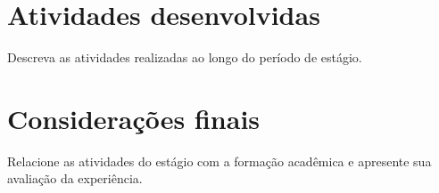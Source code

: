 \documentclass[12pt,a4paper,oneside]{book}
\begin{document}
\chapter{Atividades desenvolvidas}\label{cap:atividades}

Descreva as atividades realizadas ao longo do período de estágio.

\chapter{Considerações finais}\label{cap:conclusao}

Relacione as atividades do estágio com a formação acadêmica e apresente
sua avaliação da experiência.


\backmatter

%
\end{document}
